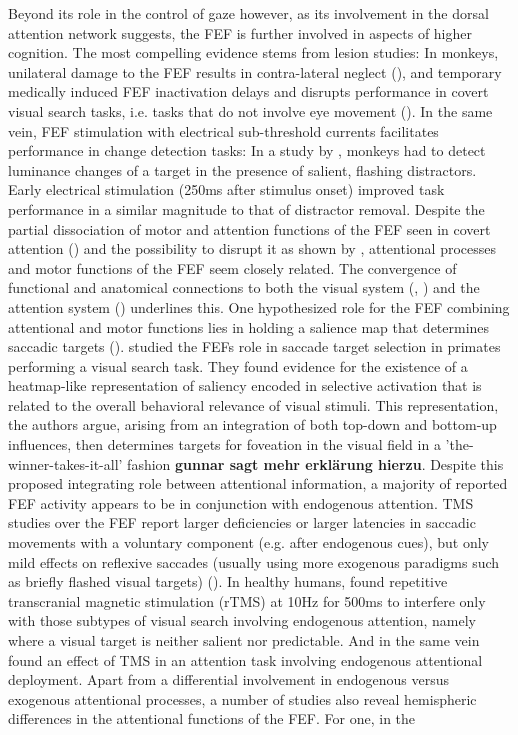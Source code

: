 \documentclass[a4paper, 12pt]{scrreprt}
\begin{document}
Beyond its role in the control of gaze however, as its involvement in the dorsal attention network suggests, the FEF is further involved in aspects of higher cognition. The most compelling evidence stems from lesion studies: In monkeys, unilateral damage to the FEF results in contra-lateral neglect (\cite{crowne1981effects}), and temporary medically induced FEF inactivation delays and disrupts performance in covert visual search tasks, i.e. tasks that do not involve eye movement (\cite{monosov2009frontal}). In the same vein, FEF stimulation with electrical sub-threshold currents facilitates performance in change detection tasks: In a study by \textcite{moore2004microstimulation}, monkeys had to detect luminance changes of a target in the presence of salient, flashing distractors. Early electrical stimulation (250ms after stimulus onset) improved task performance in a similar magnitude to that of distractor removal. \newline Despite the partial dissociation of motor and attention functions of the FEF seen in covert attention (\cite{vossel2014dorsal}) and the possibility to disrupt it as shown by \textcite{monosov2009frontal}, attentional processes and motor functions of the FEF seem closely related. The convergence of functional and anatomical connections to both the visual system (\cite{stanton1995topography}, \cite{schall1995topography}) and the attention system (\cite{corbetta2002control}) underlines this. One hypothesized role for the FEF combining attentional and motor functions lies in holding a salience map that determines saccadic targets (\cite{itti2001computational}). \textcite{thompson2005visual} studied the FEFs role in saccade target selection in primates performing a visual search task. They found evidence for the existence of a heatmap-like representation of saliency encoded in selective activation that is related to the overall behavioral relevance of visual stimuli. This representation, the authors argue, arising from an integration of both top-down and bottom-up influences, then determines targets for foveation in the visual field in a 'the-winner-takes-it-all' fashion \textbf{gunnar sagt mehr erklärung hierzu}. Despite this proposed integrating role between attentional information, a majority of reported FEF activity appears to be in conjunction with endogenous attention. TMS studies over the FEF report larger deficiencies or larger latencies in saccadic movements with a voluntary component (e.g. after endogenous cues), but only mild effects on reflexive saccades (usually using more exogenous paradigms such as briefly flashed visual targets) (\cite{vernet2014corrigendum}). In healthy humans, \textcite{muggleton2003human} found repetitive transcranial magnetic stimulation (rTMS) at 10Hz for 500ms to interfere only with those subtypes of visual search involving endogenous attention, namely where a visual target is neither salient nor predictable. And \textcite{grosbras2002transcranial}in the same vein found an effect of TMS in an attention task involving endogenous attentional deployment. Apart from a differential involvement in endogenous versus exogenous attentional processes, a number of studies also reveal hemispheric differences in the attentional functions of the FEF. For one, in the 
\end{document}
